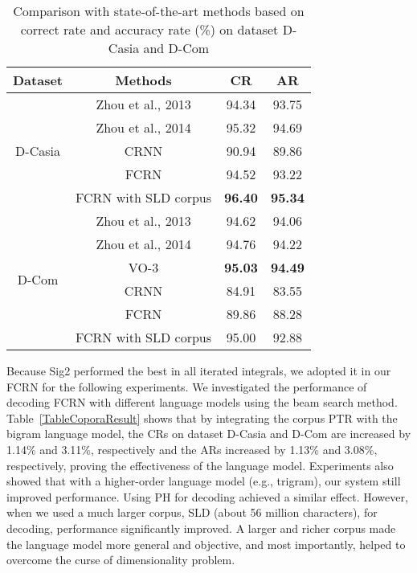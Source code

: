 \documentclass[10pt,conference,a4paper]{IEEEtran}
\begin{document}
\begin{table}[b]
\caption{Comparison with state-of-the-art methods based on correct rate and accuracy rate (\%) on dataset D-Casia and D-Com}
\label{TableFinalResult}
\centering
\begin{tabular}{c|c|cc}
\hline
Dataset&Methods&CR&AR\\
\hline
\multirow{5}{*}{D-Casia}&Zhou et al., 2013\cite{zhou2013handwritten}&94.34&93.75 \\
&Zhou et al., 2014\cite{zhou2014minimum}&95.32 & 94.69\\
&CRNN\cite{shi2015end}& 90.94& 89.86\\
&FCRN& 94.52& 93.22\\
&FCRN with SLD corpus& \textbf{96.40}&\textbf{95.34} \\
\hline
\multirow{6}{*}{D-Com}&Zhou et al., 2013\cite{zhou2013handwritten}&94.62&94.06\\
&Zhou et al., 2014\cite{zhou2014minimum}&94.76&94.22\\
&VO-3\cite{yin2013icdar}&\textbf{95.03}&\textbf{94.49} \\
&CRNN\cite{shi2015end}& 84.91&83.55\\
&FCRN& 89.86&88.28\\
&FCRN with SLD corpus&95.00&92.88\\
\hline
\end{tabular}
\end{table}


Because Sig2 performed the best in all iterated integrals, we adopted it in our FCRN for the following experiments.
We investigated the performance of decoding FCRN with different language models using the beam search method. Table~\ref{TableCoporaResult} shows that by integrating the corpus PTR with the bigram language model, the CRs on dataset D-Casia and D-Com are increased by 1.14\% and 3.11\%, respectively and the ARs increased by 1.13\% and 3.08\%, respectively, proving the effectiveness of the language model. Experiments also showed that with a higher-order language model (e.g., trigram), our system still improved performance. %
Using PH for decoding achieved a similar effect.
However, when we used a much larger corpus, SLD (about 56 million characters), for decoding, performance significantly improved. A larger and richer corpus made the language model more general and objective, and most importantly, helped to overcome the curse of dimensionality problem\cite{bengio2006neural}.
\end{document}
